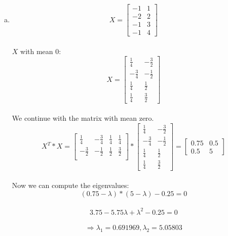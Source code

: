 \documentclass[12pt]{article}
\begin{document}
\begin{enumerate}[a)]
\begin{itemize}
        		\end{itemize}
    \item
        $$X =\begin{bmatrix} -1&1 \\ -2&2 \\ -1 & 3 \\ -1 & 4 \end{bmatrix}$$\\
        $X$ with mean $0$:\\
        $$X =\begin{bmatrix} \frac{1}{4}& -\frac{3}{2} \\ -\frac{3}{4}&-\frac{1}{2} \\ \frac{1}{4} & \frac{1}{2} \\ \frac{1}{4} & \frac{3}{2} \end{bmatrix}$$\\
        We continue with the matrix with mean zero.\\
        $$X^T * X = \begin{bmatrix} \frac{1}{4} & -\frac{3}{4} & \frac{1}{4}  & \frac{1}{4}\\
        				-\frac{3}{2}& -\frac{1}{2} & \frac{1}{2} & \frac{3}{2} \\
        				\end{bmatrix} *
        				\begin{bmatrix} \frac{1}{4}& -\frac{3}{2} \\ -\frac{3}{4}&-\frac{1}{2} \\ \frac{1}{4} & \frac{1}{2} \\ \frac{1}{4} & \frac{3}{2} \end{bmatrix}
        				= \begin{bmatrix}
        					0.75 & 0.5 \\
        					0.5 & 5
        				\end{bmatrix}
        				$$\\
        	Now we can compute the eigenvalues:\\
        		$$ (0.75 - \lambda)*(5 - \lambda)-0.25 =0$$\\
        		$$ 3.75 - 5.75\lambda + \lambda^2 -0.25 = 0$$\\
        		$$ \Rightarrow \lambda_1= 0.691969, \lambda_2=5.05803 $$\\
        		

\end{enumerate}
\end{document}
